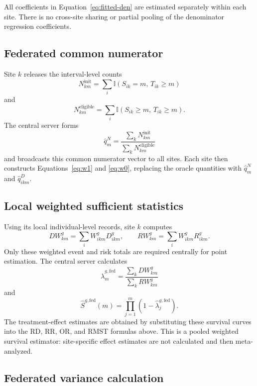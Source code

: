 \documentclass[11pt]{article}
\newcommand{\ind}{\mathbb{I}}
\begin{document}
All coefficients in Equation~\eqref{eq:fitted-den} are estimated separately
within each site. There is no cross-site sharing or partial pooling of the
denominator regression coefficients.

\subsection{Federated common numerator}

Site $k$ releases the interval-level counts
\[
  N^{\mathrm{init}}_{km}
  =\sum_i\ind(S_{ik}=m,\,T_{ik}\geq m)
\]
and
\[
  N^{\mathrm{eligible}}_{km}
  =\sum_i\ind(S_{ik}\geq m,\,T_{ik}\geq m).
\]
The central server forms
\begin{equation}
\label{eq:fed-num}
  \widehat q_m^N
  =\frac{\sum_k N^{\mathrm{init}}_{km}}
         {\sum_k N^{\mathrm{eligible}}_{km}}
\end{equation}
and broadcasts this common numerator vector to all sites. Each site then
constructs Equations~\eqref{eq:w1} and \eqref{eq:w0}, replacing the oracle
quantities with $\widehat q_m^N$ and $\widehat q^D_{ikm}$.

\subsection{Local weighted sufficient statistics}

Using its local individual-level records, site $k$ computes
\[
  DW^g_{km}=\sum_i W^g_{ikm}D^g_{ikm},
  \qquad
  RW^g_{km}=\sum_i W^g_{ikm}R^g_{ikm}.
\]
Only these weighted event and risk totals are required centrally for point
estimation. The central server calculates
\begin{equation}
\label{eq:fed-hazard}
  \widehat\lambda^{g,\mathrm{fed}}_m
  =\frac{\sum_k DW^g_{km}}{\sum_k RW^g_{km}}
\end{equation}
and
\[
  \widehat S^{g,\mathrm{fed}}(m)
  =\prod_{j=1}^m
     \left(1-\widehat\lambda^{g,\mathrm{fed}}_j\right).
\]
The treatment-effect estimates are obtained by substituting these survival
curves into the RD, RR, OR, and RMST formulas above. This is a pooled weighted
survival estimator: site-specific effect estimates are not calculated and
then meta-analyzed.

\subsection{Federated variance calculation}
\end{document}
